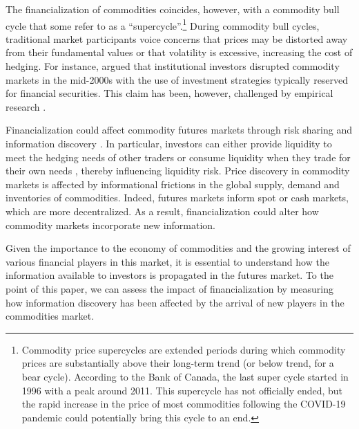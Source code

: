 \documentclass[12pt]{article}
\begin{document}
The financialization of commodities coincides, however, with a commodity bull cycle \citep*{humphreys2010great} that some refer to as a ``supercycle''.\footnote{Commodity price supercycles are extended periods during which commodity prices are substantially above their long-term trend (or below trend, for a bear cycle). According to the Bank of Canada, the last super cycle started in 1996 with a peak around 2011. This supercycle has not officially ended, but the rapid increase in the price of most commodities following the COVID-19 pandemic could potentially bring this cycle to an end.} During commodity bull cycles, traditional market participants voice concerns that prices may be distorted away from their fundamental values or that volatility is excessive, increasing the cost of hedging. For instance, \citet{masters2009testimony} argued that institutional investors disrupted commodity markets in the mid-2000s with the use of investment strategies typically reserved for financial securities. This claim has been, however, challenged by empirical research \citep*{irwin2011index,irwin2012testing,irwin2012financialization}. 


Financialization could affect commodity futures markets through risk sharing and information discovery \citep*{cheng2014financialization}.  In particular, investors can either provide liquidity to meet the hedging needs of other traders or consume liquidity when they trade for their own needs \citep*{kang2020tale}, thereby influencing liquidity risk. Price discovery in commodity markets is affected by informational frictions in the global supply, demand and inventories of commodities. Indeed, futures markets inform spot or cash markets, which are more decentralized. As a result, financialization could alter how commodity markets incorporate new information.

Given the importance to the economy of commodities and the growing interest of various financial players in this market, it is essential to understand how the information available to investors is propagated in the futures market. To the point of this paper, we can assess the impact of financialization by measuring how information discovery has been affected by the arrival of new players in the commodities market.
\end{document}

